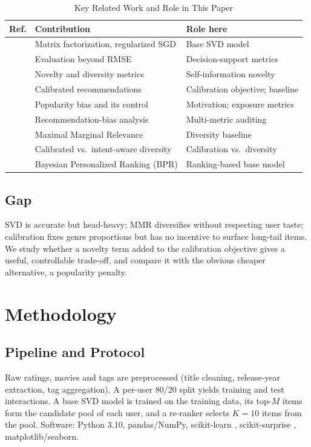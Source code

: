 \documentclass[conference]{IEEEtran}
\begin{document}
  \begin{table}[t]
  \centering
  \caption{Key Related Work and Role in This Paper}
  \label{tab:related}
  \renewcommand{\arraystretch}{1.1}
  \small
  \begin{tabular}{@{}p{0.9cm}p{3.0cm}p{3.5cm}@{}}
  \toprule
  \textbf{Ref.} & \textbf{Contribution} & \textbf{Role here}\\
  \midrule
  \cite{koren2009,funk2006} & Matrix factorization, regularized SGD & Base SVD model\\
  \cite{herlocker2004} & Evaluation beyond RMSE & Decision-support metrics\\
  \cite{vargas2011} & Novelty and diversity metrics & Self-information novelty\\
  \cite{steck2018} & Calibrated recommendations & Calibration objective; baseline\\
  \cite{abdollahpouri2019,abdollahpouri2017} & Popularity bias and its control & Motivation; exposure metrics\\
  \cite{jannach2015} & Recommendation-bias analysis & Multi-metric auditing\\
  \cite{carbonell1998} & Maximal Marginal Relevance & Diversity baseline\\
  \cite{kaya2019} & Calibrated vs.\ intent-aware diversity & Calibration vs.\ diversity\\
  \cite{rendle2009} & Bayesian Personalized Ranking (BPR) & Ranking-based base model\\
  \bottomrule
  \end{tabular}
  \end{table}

  \subsection{Gap}
  SVD is accurate but head-heavy; MMR diversifies without respecting user taste; calibration fixes genre proportions but has no incentive to surface long-tail items. We study whether a novelty term added to the calibration objective gives a useful, controllable trade-off, and compare it with the obvious cheaper alternative, a popularity penalty.

  \section{Methodology}\label{sec:method}
  \subsection{Pipeline and Protocol}
  Raw ratings, movies and tags are preprocessed (title cleaning, release-year extraction, tag aggregation). A per-user 80/20 split yields training and test interactions. A base SVD model \cite{hug2020} is trained on the training data, its top-$M$ items form the candidate pool of each user, and a re-ranker selects $K=10$ items from the pool. Software: Python 3.10, pandas/NumPy, scikit-learn \cite{pedregosa2011}, scikit-surprise \cite{hug2020}, matplotlib/seaborn.
\end{document}
